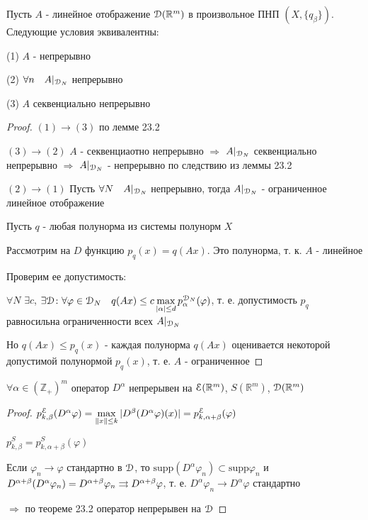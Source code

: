 \documentclass[a4paper,12pt]{report}
\newcommand*{\hm}[1]{#1\nobreak\discretionary{}%
            {\hbox{$\mathsurround=0pt #1$}}{}}
\begin{document}
\begin{thm}
Пусть $A$ - линейное отображение $\EuScript D(\mathbb R^m)$ в произвольное ПНП $\left(X,\{q_\beta\}\right)$. Следующие условия эквивалентны:

(1) $A$ - непрерывно

(2) $\forall n\quad A|_{\EuScript D_N}$ непрерывно

(3) $A$ секвенциально непрерывно
\end{thm}
\begin{proof}
$(1)\to(3)$ по лемме 23.2

$(3)\to(2)$ $A$ - секвенциаотно непрерывно $\Rightarrow$ $A|_{\EuScript D_N}$ секвенциально непрерывно $\Rightarrow$ $A|_{\EuScript D_N}$ - непрерывно по следствию из леммы 23.2

$(2)\to(1)$ Пусть $\forall N\quad A|_{\EuScript D_N}$ непрерывно, тогда $A|_{\EuScript D_N}$ - ограниченное линейное отображение

Пусть $q$ - любая полунорма из системы полунорм $X$

Рассмотрим на $D$ функцию $p_q(x)=q(Ax)$. Это полунорма, т. к. $A$ - линейное

Проверим ее допустимость:

$\forall N$ $\exists c$, $\exists\EuScript D\colon\forall\varphi\in\EuScript D_N\quad q(Ax)\le c\max\limits_{|\alpha|\le d}p_\alpha^{\EuScript D_N}(\varphi)$, т. е. допустимость $p_q$ равносильна ограниченности всех $A|_{\EuScript D_N}$

Но $q(Ax)\le p_q(x)$ - каждая полунорма $q(Ax)$ оценивается некоторой допустимой полунормой $p_q(x)$, т. е. $A$ - ограниченное
\end{proof}


\begin{prop}
$\forall\alpha\in(\mathbb Z_+)^m$ оператор $D^\alpha$ непрерывен на $\EuScript E(\mathbb R^m)$, $S(\mathbb R^m)$, $\EuScript D(\mathbb R^m)$
\end{prop}
\begin{proof}
$p_{k,\beta}^{\EuScript E}(D^\alpha\varphi)=\max\limits_{\|x\|\le k}|D^\beta(D^\alpha\varphi)(x)|=p_{k,\alpha+\beta}^{\EuScript E}(\varphi)$

$p_{k,\beta}^S=p_{k,\alpha+\beta}^S(\varphi)$

Если $\varphi_n\to\varphi$ стандартно в $\EuScript D$, то $\mathrm{supp}(D^\alpha\varphi_n)\subset\mathrm{supp}\varphi_n$ и $D^{\alpha+\beta}(D^\alpha\varphi_n)\hm=D^{\alpha+\beta}\varphi_n\rightrightarrows D^{\alpha+\beta}\varphi$, т. е. $D^\alpha\varphi_n\to D^\alpha\varphi$ стандартно

$\Rightarrow$ по теореме 23.2 оператор непрерывен на $\EuScript D$
\end{proof}
\end{document}
